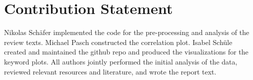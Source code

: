 \documentclass{article}
\theoremstyle{plain}
\theoremstyle{definition}
\theoremstyle{remark}
\begin{document}
\section*{Contribution Statement}

Nikolas Schäfer implemented the code for the pre-processing and analysis of the review texts.
Michael Pasch constructed the correlation plot.
Isabel Schüle created and maintained the github repo and produced the visualizations for the keyword plots.
All authors jointly performed the initial analysis of the data, reviewed relevant resources and literature, and wrote the report text.



\newpage


\end{document}
